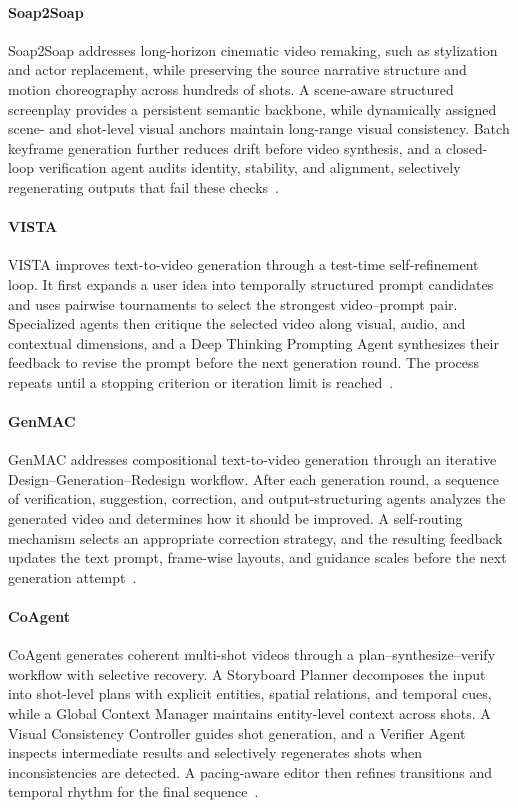 \paragraph{Soap2Soap}
Soap2Soap addresses long-horizon cinematic video remaking, such as stylization and actor replacement, while preserving the source narrative structure and motion choreography across hundreds of shots. A scene-aware structured screenplay provides a persistent semantic backbone, while dynamically assigned scene- and shot-level visual anchors maintain long-range visual consistency. Batch keyframe generation further reduces drift before video synthesis, and a closed-loop verification agent audits identity, stability, and alignment, selectively regenerating outputs that fail these checks~\cite{avg260517423}.

\paragraph{VISTA}
VISTA improves text-to-video generation through a test-time self-refinement loop. It first expands a user idea into temporally structured prompt candidates and uses pairwise tournaments to select the strongest video--prompt pair. Specialized agents then critique the selected video along visual, audio, and contextual dimensions, and a Deep Thinking Prompting Agent synthesizes their feedback to revise the prompt before the next generation round. The process repeats until a stopping criterion or iteration limit is reached~\cite{long2026vista}.

\paragraph{GenMAC}
GenMAC addresses compositional text-to-video generation through an iterative Design--Generation--Redesign workflow. After each generation round, a sequence of verification, suggestion, correction, and output-structuring agents analyzes the generated video and determines how it should be improved. A self-routing mechanism selects an appropriate correction strategy, and the resulting feedback updates the text prompt, frame-wise layouts, and guidance scales before the next generation attempt~\cite{huang2024genmac}.

\paragraph{CoAgent}
CoAgent generates coherent multi-shot videos through a plan--synthesize--verify workflow with selective recovery. A Storyboard Planner decomposes the input into shot-level plans with explicit entities, spatial relations, and temporal cues, while a Global Context Manager maintains entity-level context across shots. A Visual Consistency Controller guides shot generation, and a Verifier Agent inspects intermediate results and selectively regenerates shots when inconsistencies are detected. A pacing-aware editor then refines transitions and temporal rhythm for the final sequence~\cite{avg251222536}.

